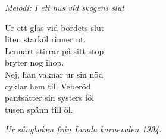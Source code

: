 {\footnotesize\textit{Melodi: I ett hus vid skogens slut}}\par
\vspace{10pt}
Ur ett glas vid bordets slut\\
liten starköl rinner ut.\\
Lennart stirrar på sitt stop\\
bryter nog ihop.\\
Nej, han vaknar ur sin nöd\\
cyklar hem till Veberöd\\
pantsätter sin systers föl\\
tusen spänn till öl.\par
\vspace{10pt}
{\footnotesize\textit{Ur sångboken från Lunda karnevalen 1994.}}
